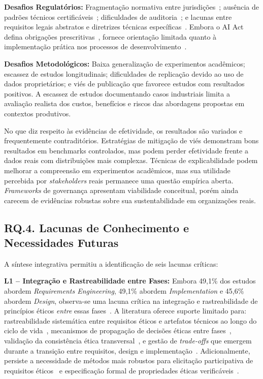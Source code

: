 \textbf{Desafios Regulatórios:} Fragmentação normativa entre jurisdições~\cite{Veale2021, Bradford2020}; ausência de padrões técnicos certificáveis~\cite{Krafft2020, Brundage2020}; dificuldades de auditoria~\cite{Costanza-Chock2020}; e lacunas entre requisitos legais abstratos e diretrizes técnicas específicas~\cite{Kaminski2023, Selbst2019}. Embora o AI Act defina obrigações prescritivas~\cite{EUAIAct2024}, fornece orientação limitada quanto à implementação prática nos processos de desenvolvimento~\cite{Veale2021, Ebers2021}.

\textbf{Desafios Metodológicos:} Baixa generalização de experimentos acadêmicos; escassez de estudos longitudinais; dificuldades de replicação devido ao uso de dados proprietários; e viés de publicação que favorece estudos com resultados positivos. A escassez de estudos documentando casos industriais limita a avaliação realista dos custos, benefícios e riscos das abordagens propostas em contextos produtivos.

No que diz respeito às evidências de efetividade, os resultados são variados e frequentemente contraditórios. Estratégias de mitigação de viés demonstram bons resultados em benchmarks controlados, mas podem perder efetividade frente a dados reais com distribuições mais complexas. Técnicas de explicabilidade podem melhorar a compreensão em experimentos acadêmicos, mas sua utilidade percebida por \textit{stakeholders} reais permanece uma questão empírica aberta. \textit{Frameworks} de governança apresentam viabilidade conceitual, porém ainda carecem de evidências robustas sobre sua sustentabilidade em organizações reais.


\subsection{RQ.4. Lacunas de Conhecimento e Necessidades Futuras}

A síntese integrativa permitiu a identificação de seis lacunas críticas:

\textbf{L1 -- Integração e Rastreabilidade entre Fases:} Embora 49,1\% dos estudos abordem \textit{Requirements Engineering}, 49,1\% abordem \textit{Implementation} e 45,6\% abordem \textit{Design}, observa-se uma lacuna crítica na integração e rastreabilidade de princípios éticos \textit{entre} essas fases~\cite{Friedman2013, Umbrello2020}. A literatura oferece suporte limitado para: rastreabilidade sistemática entre requisitos éticos e artefatos técnicos ao longo do ciclo de vida~\cite{Cleland-Huang2014}, mecanismos de propagação de decisões éticas entre fases~\cite{Ferrario2020}, validação da consistência ética transversal~\cite{Guizzardi2022}, e gestão de \textit{trade-offs} que emergem durante a transição entre requisitos, design e implementação~\cite{Green2019, Selbst2019}. Adicionalmente, persiste a necessidade de métodos mais robustos para elicitação participativa de requisitos éticos~\cite{Ahmad2018, Hadar2018, Shilton2013} e especificação formal de propriedades éticas verificáveis~\cite{Dennis2016}.

